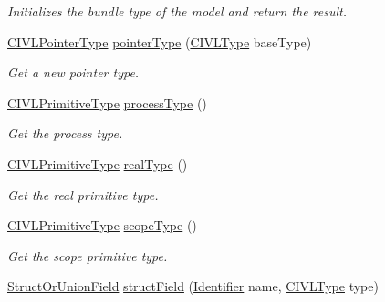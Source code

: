 \begin{DoxyCompactItemize}
\begin{DoxyCompactList}\small\item\em Initializes the bundle type of the model and return the result. \end{DoxyCompactList}\item 
\hyperlink{interfaceedu_1_1udel_1_1cis_1_1vsl_1_1civl_1_1model_1_1IF_1_1type_1_1CIVLPointerType}{C\+I\+V\+L\+Pointer\+Type} \hyperlink{classedu_1_1udel_1_1cis_1_1vsl_1_1civl_1_1model_1_1common_1_1CommonCIVLTypeFactory_ac478c72bb9d5dba54955214585c1e430}{pointer\+Type} (\hyperlink{interfaceedu_1_1udel_1_1cis_1_1vsl_1_1civl_1_1model_1_1IF_1_1type_1_1CIVLType}{C\+I\+V\+L\+Type} base\+Type)
\begin{DoxyCompactList}\small\item\em Get a new pointer type. \end{DoxyCompactList}\item 
\hyperlink{interfaceedu_1_1udel_1_1cis_1_1vsl_1_1civl_1_1model_1_1IF_1_1type_1_1CIVLPrimitiveType}{C\+I\+V\+L\+Primitive\+Type} \hyperlink{classedu_1_1udel_1_1cis_1_1vsl_1_1civl_1_1model_1_1common_1_1CommonCIVLTypeFactory_a1c04629d4e3cc454adcb6f6eaf8de732}{process\+Type} ()
\begin{DoxyCompactList}\small\item\em Get the process type. \end{DoxyCompactList}\item 
\hyperlink{interfaceedu_1_1udel_1_1cis_1_1vsl_1_1civl_1_1model_1_1IF_1_1type_1_1CIVLPrimitiveType}{C\+I\+V\+L\+Primitive\+Type} \hyperlink{classedu_1_1udel_1_1cis_1_1vsl_1_1civl_1_1model_1_1common_1_1CommonCIVLTypeFactory_aed99db0b4761fd8a75da0465b2da7be8}{real\+Type} ()
\begin{DoxyCompactList}\small\item\em Get the real primitive type. \end{DoxyCompactList}\item 
\hyperlink{interfaceedu_1_1udel_1_1cis_1_1vsl_1_1civl_1_1model_1_1IF_1_1type_1_1CIVLPrimitiveType}{C\+I\+V\+L\+Primitive\+Type} \hyperlink{classedu_1_1udel_1_1cis_1_1vsl_1_1civl_1_1model_1_1common_1_1CommonCIVLTypeFactory_a25550fc49ca89ad2ad9611903b5c292c}{scope\+Type} ()
\begin{DoxyCompactList}\small\item\em Get the scope primitive type. \end{DoxyCompactList}\item 
\hyperlink{interfaceedu_1_1udel_1_1cis_1_1vsl_1_1civl_1_1model_1_1IF_1_1type_1_1StructOrUnionField}{Struct\+Or\+Union\+Field} \hyperlink{classedu_1_1udel_1_1cis_1_1vsl_1_1civl_1_1model_1_1common_1_1CommonCIVLTypeFactory_a27f7748197906136bdcabccd96752aa6}{struct\+Field} (\hyperlink{interfaceedu_1_1udel_1_1cis_1_1vsl_1_1civl_1_1model_1_1IF_1_1Identifier}{Identifier} name, \hyperlink{interfaceedu_1_1udel_1_1cis_1_1vsl_1_1civl_1_1model_1_1IF_1_1type_1_1CIVLType}{C\+I\+V\+L\+Type} type)

\end{DoxyCompactItemize}
